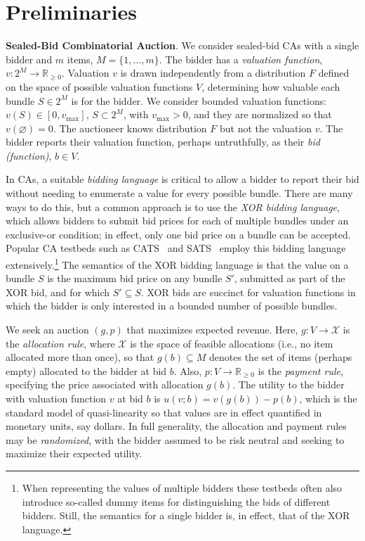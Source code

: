 \section{Preliminaries}

\textbf{Sealed-Bid Combinatorial Auction}. We consider sealed-bid CAs with a single bidder and $m$ items, $M=\{1,\ldots,m\}$.
The bidder has a {\em valuation function}, $v: 2^M \rightarrow \mathbb{R}_{\ge 0}$. Valuation $v$ is drawn independently from a distribution $F$ defined on the space of possible valuation functions $V$, determining how valuable each bundle $S\in 2^M$ is for the bidder. We consider bounded valuation functions: $v(S)\in[0, v_{\max}]$, $S\subset 2^M$, with $v_{\max}>0$, and they are normalized so that $v(\varnothing)=0$.
%
The auctioneer  knows distribution $F$ but not the  valuation  $v$. The bidder reports their valuation function, perhaps untruthfully, as their {\em bid (function)}, $b\in V$. 

In CAs, a suitable {\em bidding language} is critical to allow a bidder to report their
bid without needing to enumerate a value for every possible bundle.  There
are many ways to do this, but a  common approach is to use the {\em XOR bidding language}, which allows bidders to submit bid prices for each of multiple bundles under an exclusive-or condition; in effect, only one bid price on a bundle can be accepted. Popular CA testbeds such as CATS~\citep{leyton2000towards} and SATS~\citep{weiss2017sats} employ this bidding language extensively.\footnote{When representing the values of multiple bidders these testbeds often also introduce so-called dummy items for distinguishing the bids of different 
bidders. Still, the semantics for a single bidder is, in effect, that of the XOR language.}
The semantics of the XOR bidding language is that the value on a bundle $S$ is the maximum bid price on
any bundle $S'$, submitted as part of the XOR bid, and for which $S'\subseteq S$. XOR bids are 
succinct for valuation functions in which the bidder is only interested in a bounded number
of possible bundles.

We seek an auction $(g,p)$ that maximizes expected revenue. Here, $g: V\rightarrow \mathcal{X}$ is the {\em allocation rule},  where $\mathcal{X}$ is the space of feasible allocations (i.e., no item allocated more than once), so that $g(b)\subseteq M$ denotes the set of items (perhaps empty) allocated to the bidder at bid $b$.
%
Also, $p: V\rightarrow \mathbb{R}_{\ge 0}$ is the {\em payment rule},
specifying the price associated with allocation $g(b)$. 
The utility to the bidder with valuation function $v$ at bid  $b$ is $u(v;b)=v(g(b))-p(b)$, which is
the standard model of quasi-linearity so that values are in effect quantified in monetary units, say dollars.
%
 In full generality, the allocation and payment rules may be \emph{randomized}, with
 the bidder assumed to be risk neutral  and seeking
to maximize their 
expected utility.


